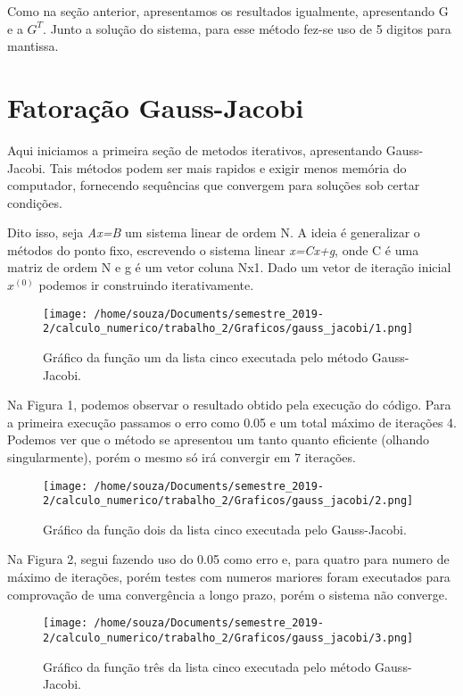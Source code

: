 \documentclass[12pt]{article}
\begin{document}
Como na seção anterior, apresentamos os resultados igualmente, apresentando G e a $G^{T}$. Junto a solução do sistema, para esse método fez-se uso de 5 digitos para mantissa.

\section{Fatoração Gauss-Jacobi}

Aqui iniciamos a primeira seção de metodos iterativos, apresentando Gauss-Jacobi. Tais métodos podem ser mais rapidos e exigir  menos memória do computador, fornecendo sequências que convergem para soluções sob certar condições.

Dito isso, seja \textit{Ax=B} um sistema linear de ordem N. A ideia é generalizar o métodos do ponto fixo, escrevendo o sistema linear \textit{x=Cx+g}, onde C é uma matriz de ordem N e g é um vetor coluna Nx1. Dado um vetor de iteração inicial $x^{(0)}$ podemos ir construindo iterativamente. 

\begin{figure}[!h]
    \centering
    \texttt{[image: /home/souza/Documents/semestre\_2019-2/calculo\_numerico/trabalho\_2/Graficos/gauss\_jacobi/1.png]}
    \caption{Gráfico da função um da lista cinco executada pelo método Gauss-Jacobi.}
\end{figure}

Na Figura 1, podemos observar o resultado obtido pela execução do código. Para a primeira execução passamos o erro como 0.05 e um total máximo de iterações 4. Podemos ver que o método se apresentou um tanto quanto eficiente (olhando singularmente), porém o mesmo só irá convergir  em  7 iterações.

\begin{figure}[!h]
    \centering
    \texttt{[image: /home/souza/Documents/semestre\_2019-2/calculo\_numerico/trabalho\_2/Graficos/gauss\_jacobi/2.png]}
    \caption{Gráfico da função dois da lista cinco executada pelo Gauss-Jacobi.}
\end{figure}

Na Figura 2, segui fazendo uso do 0.05 como erro e, para quatro para numero de máximo de iterações, porém testes com numeros mariores foram executados para comprovação de uma convergência a longo prazo, porém o sistema não converge.

\begin{figure}[!h]
    \centering
    \texttt{[image: /home/souza/Documents/semestre\_2019-2/calculo\_numerico/trabalho\_2/Graficos/gauss\_jacobi/3.png]}
    \caption{Gráfico da função três da lista cinco executada pelo método Gauss-Jacobi.}
\end{figure}
\end{document}

